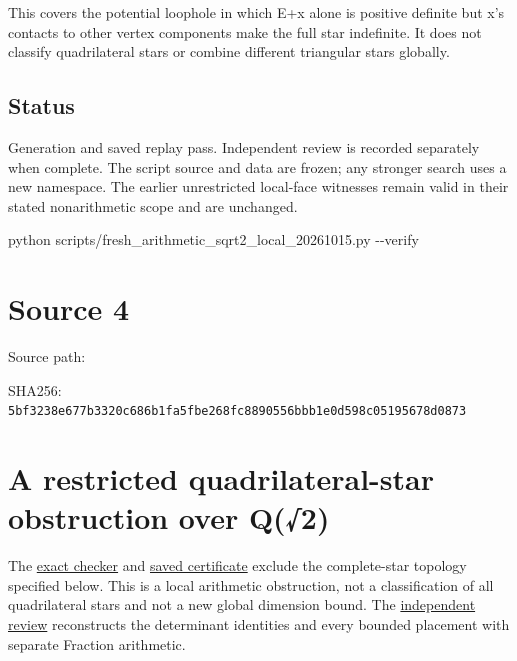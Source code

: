 \documentclass[
  10pt,
]{report}
\newenvironment{Shaded}{}{}
\newcommand{\AttributeTok}[1]{\textcolor[rgb]{0.49,0.56,0.16}{#1}}
\newcommand{\ExtensionTok}[1]{#1}
\newcommand{\NormalTok}[1]{#1}
\begin{document}
This covers the potential loophole in which E+x alone is positive
definite but x's contacts to other vertex components make the full star
indefinite. It does not classify quadrilateral stars or combine
different triangular stars globally.

\section{Status}\label{status}

Generation and saved replay pass. Independent review is recorded
separately when complete. The script source and data are frozen; any
stronger search uses a new namespace. The earlier unrestricted
local-face witnesses remain valid in their stated nonarithmetic scope
and are unchanged.

\begin{Shaded}
\begin{Highlighting}[]
\ExtensionTok{python}\NormalTok{ scripts/fresh\_arithmetic\_sqrt2\_local\_20261015.py }\AttributeTok{{-}{-}verify}
\end{Highlighting}
\end{Shaded}

\clearpage

\chapter{Source 4}\label{source-4}

Source path: 

SHA256:
\nolinkurl{5bf3238e677b3320c686b1fa5fbe268fc8890556bbb1e0d598c05195678d0873}

\chapter{A restricted quadrilateral-star obstruction over
Q(√2)}\label{a-restricted-quadrilateral-star-obstruction-over-q2}

The \href{../scripts/fresh_arithmetic_sqrt2_quad_rank_20261015.py}{exact
checker} and \href{fresh_arithmetic_sqrt2_quad_rank_20261015.json}{saved
certificate} exclude the complete-star topology specified below. This is
a local arithmetic obstruction, not a classification of all
quadrilateral stars and not a new global dimension bound. The
\href{fresh_arithmetic_sqrt2_quad_rank_20261015_review.md}{independent
review} reconstructs the determinant identities and every bounded
placement with separate Fraction arithmetic.
\end{document}
